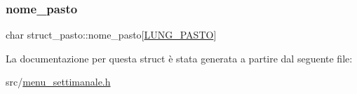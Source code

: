 \subsubsection{\texorpdfstring{nome\+\_\+pasto}{nome\_pasto}}
{\footnotesize\ttfamily char struct\+\_\+pasto\+::nome\+\_\+pasto\mbox{[}\hyperlink{menu__settimanale_8h_ab1b0c8053eda8a811aae87dd756b1530}{L\+U\+N\+G\+\_\+\+P\+A\+S\+TO}\mbox{]}}



La documentazione per questa struct è stata generata a partire dal seguente file\+:\begin{DoxyCompactItemize}
\item 
src/\hyperlink{menu__settimanale_8h}{menu\+\_\+settimanale.\+h}\end{DoxyCompactItemize}
